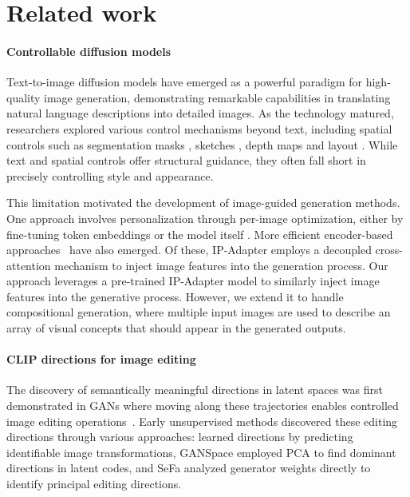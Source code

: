 \section{Related work}
\paragraph{\textbf{Controllable diffusion models}}
Text-to-image diffusion models \citep{nichol2021glide, balaji2022ediffi,rombach2021highresolution, 
ramesh2022hierarchical,
saharia2022photorealistic,ho2020denoising} have emerged as a powerful paradigm for high-quality image generation, demonstrating remarkable capabilities in translating natural language descriptions into detailed images. As the technology matured, researchers explored various control mechanisms beyond text, including spatial controls such as segmentation masks \citep{couairon2022diffedit}, sketches \citep{voynov2023sketch}, depth maps \citep{zhang2023adding, mou2024t2i, bhat2023loosecontrolliftingcontrolnetgeneralized} and layout \citep{dahary2024yourselfboundedattentionmultisubject, avrahami2023spatext,zheng2023layoutdiffusion, li2023gligenopensetgroundedtexttoimage}. While text and spatial controls offer structural guidance, they often fall short in precisely controlling style and appearance. 

This limitation motivated the development of image-guided generation methods. 
One approach involves personalization through per-image optimization, either by fine-tuning token embeddings \citep{gal2022textual} or the model itself \citep{ruiz2022dreambooth}. More efficient encoder-based approaches~\citep{gal2023encoder,arar2023domain,ruiz2023hyperdreambooth,Wei_2023_ICCV,mou2024t2i,ye2023ipadapter} have also emerged. Of these, IP-Adapter \citep{ye2023ipadapter} employs a decoupled cross-attention mechanism to inject image features into the generation process. Our approach leverages a pre-trained IP-Adapter model to similarly inject image features into the generative process. However, we extend it to handle compositional generation, where multiple input images are used to describe an array of visual concepts that should appear in the generated outputs.

\paragraph{\textbf{CLIP directions for image editing}}
The discovery of semantically meaningful directions in latent spaces was first demonstrated in GANs \citep{goodfellow2014generative, karras2019style} where moving along these trajectories enables controlled image editing operations~\citep{shen2020interpreting}. Early unsupervised methods discovered these editing directions through various approaches: \citep{voynov2020unsupervised} learned directions by predicting identifiable image transformations, GANSpace \citep{harkonen2020ganspace} employed PCA to find dominant directions in latent codes, and SeFa \citep{shen2021closedformfactorizationlatentsemantics} analyzed generator weights directly to identify principal editing directions. 


